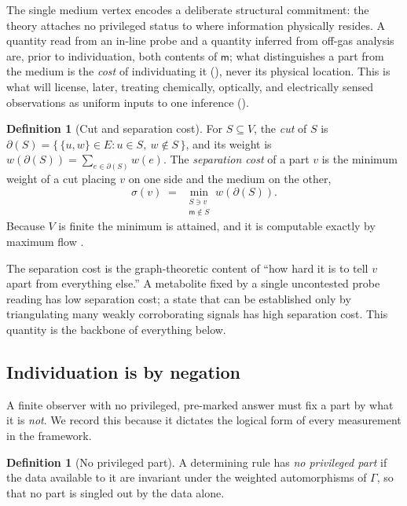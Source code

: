 \documentclass[11pt,twocolumn,a4paper]{article}
\theoremstyle{thmstyle}
\theoremstyle{definition}
\newtheorem{definition}[theorem]{Definition}
\theoremstyle{remark}
\newcommand{\cut}{\partial}
\newcommand{\Gph}{\Gamma}
\newcommand{\V}{V}
\newcommand{\E}{E}
\newcommand{\wt}{w}
\newcommand{\med}{\mathsf{m}}
\begin{document}
The single medium vertex encodes a deliberate structural commitment: the
theory attaches no privileged status to where information physically
resides. A quantity read from an in-line probe and a quantity inferred from
off-gas analysis are, prior to individuation, both contents of $\med$; what
distinguishes a part from the medium is the \emph{cost} of individuating
it (), never its physical location. This is what will
license, later, treating chemically, optically, and electrically sensed
observations as uniform inputs to one inference ().

\begin{definition}[Cut and separation cost]
\label{def:sepcost}
For $S\subseteq\V$, the \emph{cut} of $S$ is
$\cut(S)=\{\,\{u,w\}\in\E : u\in S,\ w\notin S\,\}$, and its weight is
$\wt(\cut(S))=\sum_{e\in\cut(S)}\wt(e)$. The \emph{separation cost} of a
part $v$ is the minimum weight of a cut placing $v$ on one side and the
medium on the other,
\[
\sigma(v)\;=\;\min_{\substack{S\ni v\\ \med\notin S}}\wt(\cut(S)).
\]
Because $\V$ is finite the minimum is attained, and it is computable
exactly by maximum flow \citep{fordfulkerson1956maximal}.
\end{definition}

The separation cost is the graph-theoretic content of ``how hard it is to
tell $v$ apart from everything else.'' A metabolite fixed by a single
uncontested probe reading has low separation cost; a state that can be
established only by triangulating many weakly corroborating signals has
high separation cost. This quantity is the backbone of everything below.

\subsection{Individuation is by negation}

A finite observer with no privileged, pre-marked answer must fix a part by
what it is \emph{not}. We record this because it dictates the logical form
of every measurement in the framework.

\begin{definition}[No privileged part]
\label{def:noprivilege}
A determining rule has \emph{no privileged part} if the data available to
it are invariant under the weighted automorphisms of $\Gph$, so that no
part is singled out by the data alone.
\end{definition}
\end{document}
